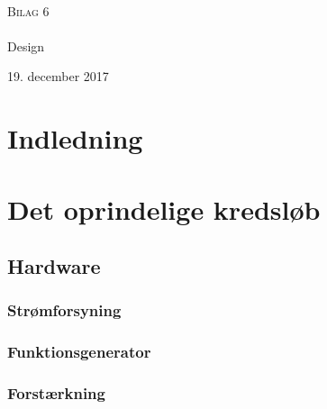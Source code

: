 

\begin{titlingpage}
\begin{center}

~ \\[3cm]


\textsc{\LARGE Bilag 6}\\[1.5cm]


\noindent\makebox[\linewidth]{\rule{\textwidth}{0.4pt}}\\
[0.5cm]{\Huge Design}
\noindent\makebox[\linewidth]{\rule{\textwidth}{0.4pt}}
\end{center}
\vfill
\begin{center}
{\large 19. december 2017}
\end{center}
\end{titlingpage}

\newpage
\tableofcontents*
\newpage

\chapter{Indledning}



\chapter{Det oprindelige kredsløb}
\section{Hardware}

\subsection{Strømforsyning}



\subsection{Funktionsgenerator}




\subsection{Forstærkning}








